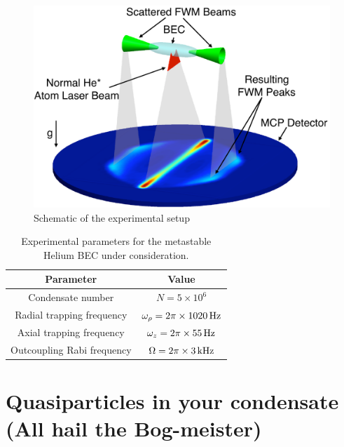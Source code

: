 \begin{figure}[htbp]
    \centering
        \includegraphics[height=3in]{Schematic}
    \caption{Schematic of the experimental setup}
    \label{Peaks:Schematic}
\end{figure}


\begin{table}
    \centering
    \begin{tabular}{cc}
    \toprule
    Parameter & Value\\
    \midrule
    Condensate number & $N = 5\times 10^6$\\
    Radial trapping frequency & $\omega_\rho = 2 \pi \times \unit[1020]{Hz}$\\
    Axial trapping frequency & $\omega_z = 2\pi \times \unit[55]{Hz}$\\
    Outcoupling Rabi frequency & $\Omega = 2\pi \times \unit[3]{kHz}$\\
    \bottomrule
    \end{tabular}
    \caption{Experimental parameters for the metastable Helium BEC under consideration.}
    \label{Peaks:ExperimentalParameters}
\end{table}



\section{Quasiparticles in your condensate (All hail the Bog-meister)}


